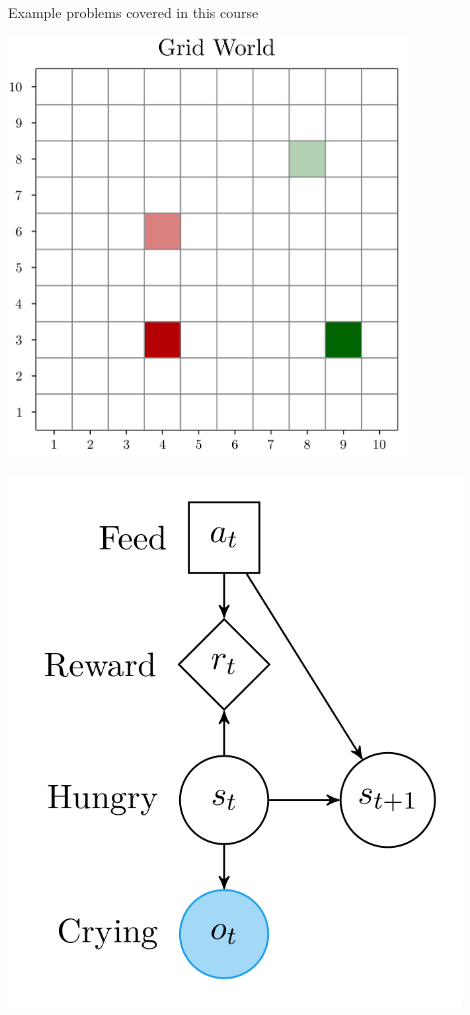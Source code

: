\begin{frame}[fragile]{Example problems covered in this course}
\begin{minipage}[b]{0.18\textwidth}
    \centering
    \includegraphics[align=c, width=0.8\textwidth]{images/grid-world.png}
\end{minipage}
\hfill
\begin{minipage}[b]{0.18\textwidth}
    \centering
    \includegraphics[align=c, width=0.9\textwidth]{images/crying-baby.png}

\end{minipage}
\end{frame}
